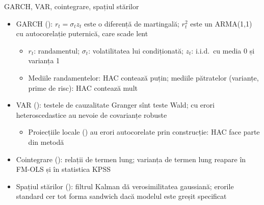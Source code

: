 \begin{frame}{GARCH, VAR, cointegrare, spațiul stărilor}
\itemsize{\footnotesize}
\begin{itemize}
    \item GARCH (): $r_t = \sigma_t z_t$ este o diferență de martingală; $r_t^2$ este un ARMA(1,1) cu autocorelație puternică, care scade lent
    \begin{itemize}
        \item $r_t$: randamentul; $\sigma_t$: volatilitatea lui condiționată; $z_t$: i.i.d.\ cu media 0 și varianța 1
        \item Mediile randamentelor: HAC contează puțin; mediile pătratelor (varianțe, prime de risc): HAC contează mult
    \end{itemize}
    \item VAR (): testele de cauzalitate Granger sînt teste Wald; cu erori heteroscedastice au nevoie de covarianțe robuste
    \begin{itemize}
        \item Proiecțiile locale () au erori autocorelate prin construcție: HAC face parte din metodă
    \end{itemize}
    \item Cointegrare (): relații de termen lung; varianța de termen lung reapare în FM-OLS și în statistica KPSS
    \item Spațiul stărilor (): filtrul Kalman dă verosimilitatea gaussiană; erorile standard cer tot forma sandwich dacă modelul este greșit specificat
\end{itemize}
\end{frame}

